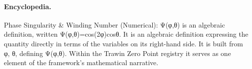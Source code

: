 \paragraph{Encyclopedia.}
Phase Singularity \& Winding Number (Numerical): Ψ(φ,θ) is an algebraic definition, written Ψ(φ,θ)=cos(2φ)cosθ. It is an algebraic definition expressing the quantity directly in terms of the variables on its right-hand side. It is built from φ, θ, defining Ψ(φ,θ). Within the Trawin Zero Point registry it serves as one element of the framework's mathematical narrative.
